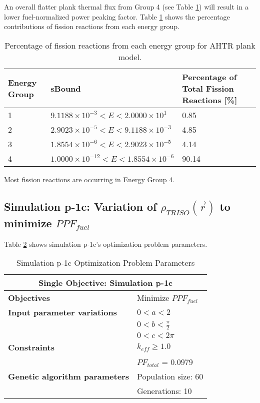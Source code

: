 An overall flatter plank thermal flux from Group 4 (see Table \ref{tab:fission-flux}) will 
result in a lower fuel-normalized power peaking factor. 
Table \ref{tab:fission-flux} shows the percentage contributions of fission reactions from 
each energy group. 
\begin{table}[H]
    \centering
    \onehalfspacing
    \caption{Percentage of fission reactions from each energy group for \gls{AHTR} plank model.}
	\label{tab:fission-flux}
    \footnotesize
    \begin{tabular}{llp{4cm}}
    \hline 
    \textbf{Energy Group} & \textbf{sBound} & \textbf{Percentage of Total Fission Reactions [\%]} \\
    \hline
    1 & $9.1188\times 10^{-3} < E < 2.0000\times 10^1$ & 0.85 \\ 
    2 & $2.9023\times 10^{-5} < E < 9.1188\times 10^{-3}$ & 4.85 \\
    3 & $1.8554\times 10^{-6} < E < 2.9023\times 10^{-5}$ & 4.14 \\
    4 & $1.0000\times 10^{-12} < E < 1.8554\times 10^{-6}$ & 90.14 \\
    \hline
    \end{tabular}
\end{table}
Most fission reactions are occurring in Energy Group 4. 

\subsection{Simulation p-1c: Variation of $\rho_{TRISO}(\vec{r})$ to minimize $PPF_{fuel}$}
Table \ref{tab:simulationp1c} shows simulation p-1c's optimization problem parameters. 
\begin{table}[H]
    \centering
    \onehalfspacing
    \caption{Simulation p-1c Optimization Problem Parameters}
	\label{tab:simulationp1c}
    \footnotesize
    \begin{tabular}{l|p{3cm}}
    \hline 
    \multicolumn{2}{c}{\textbf{Single Objective: Simulation p-1c}} \\
    \hline 
    \textbf{Objectives} & Minimize $PPF_{fuel}$ \\
    \hline 
    \textbf{Input parameter variations} & $0<a<2$ \\
    & $0<b<\frac{\pi}{2}$ \\
    & $0<c<2\pi$ \\
    \hline
    \textbf{Constraints} & $k_{eff} \geq 1.0$\\ 
    & $PF_{total}$ = 0.0979\\
    \hline 
    \textbf{Genetic algorithm parameters} & Population size: 60 \\
    & Generations: 10 \\
    \hline
    \end{tabular}
\end{table}

